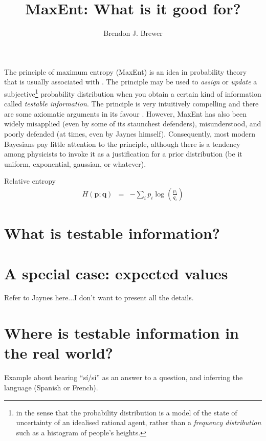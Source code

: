 \documentclass[letterpaper, 11pt]{article}
\title{MaxEnt: What is it good for?}
\author{Brendon J. Brewer}
\begin{document}
\maketitle

The principle of maximum entropy (MaxEnt) is an idea in probability theory
that is usually associated with \citet{jaynes}. The principle may be used
to {\it assign} or {\it update} a
subjective\footnote{in the sense that the probability distribution is a model
of the state of uncertainty of an idealised rational agent, rather than
a {\it frequency distribution} such as a histogram of people's heights.}
probability distribution when you obtain a certain kind of information
called {\it testable information}. The principle is very intuitively compelling
and there are some axiomatic arguments in its favour
\citep[e.g.][]{2010arXiv1008.4831K}. However, MaxEnt has also been widely
misapplied (even by some of its staunchest defenders), misunderstood,
and poorly defended (at times, even by Jaynes himself).
Consequently, most modern Bayesians pay little attention to the principle,
although there is a tendency among physicists to invoke it as a justification
for a prior distribution (be it uniform, exponential, gaussian, or whatever).






Relative entropy
\begin{eqnarray}
H(\boldsymbol{p}; \boldsymbol{q}) &=& -\sum_i p_i \log\left(\frac{p_i}{q_i}\right) 
\end{eqnarray}

\section{What is testable information?}

\section{A special case: expected values}\label{sec:expectations}
Refer to Jaynes here...I don't want to present all the details.

\section{Where is testable information in the real world?}

Example about hearing ``sí/si'' as an answer to a question,
and inferring the language (Spanish or French).
\end{document}
